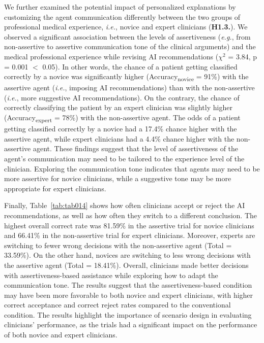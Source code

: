 

We further examined the potential impact of personalized explanations by customizing the agent communication differently between the two groups of professional medical experience, {\it i.e.}, novice and expert clinicians ({\bf H1.3.}).
We observed a significant association between the levels of assertiveness ({\it e.g.}, from non-assertive to assertive communication tone of the clinical arguments) and the medical professional experience while revising \ac{AI} recommendations ($\chi^2$ = 3.84, p = 0.001 $<$ 0.05).
In other words, the chance of a patient getting classified correctly by a novice was significantly higher (Accuracy\textsubscript{novice} = 91\%) with the assertive agent ({\it i.e.}, imposing \ac{AI} recommendations) than with the non-assertive ({\it i.e.}, more suggestive \ac{AI} recommendations).
On the contrary, the chance of correctly classifying the patient by an expert clinician was slightly higher (Accuracy\textsubscript{expert} = 78\%) with the non-assertive agent.
The odds of a patient getting classified correctly by a novice had a 17.4\% chance higher with the assertive agent, while expert clinicians had a 4.4\% chance higher with the non-assertive agent.
These findings suggest that the level of assertiveness of the agent's communication may need to be tailored to the experience level of the clinician.
Exploring the communication tone indicates that agents may need to be more assertive for novice clinicians, while a suggestive tone may be more appropriate for expert clinicians.

Finally, Table~\ref{tab:tab014} shows how often clinicians accept or reject the \ac{AI} recommendations, as well as how often they switch to a different conclusion.
The highest overall correct rate was 81.59\% in the assertive trial for novice clinicians and 66.41\% in the non-assertive trial for expert clinicians.
Moreover, experts are switching to fewer wrong decisions with the non-assertive agent (Total = 33.59\%).
On the other hand, novices are switching to less wrong decisions with the assertive agent (Total = 18.41\%).
Overall, clinicians made better decisions with assertiveness-based assistance while exploring how to adapt the communication tone.
The results suggest that the assertiveness-based condition may have been more favorable to both novice and expert clinicians, with higher correct acceptance and correct reject rates compared to the conventional condition.
The results highlight the importance of scenario design in evaluating clinicians' performance, as the trials had a significant impact on the performance of both novice and expert clinicians.

